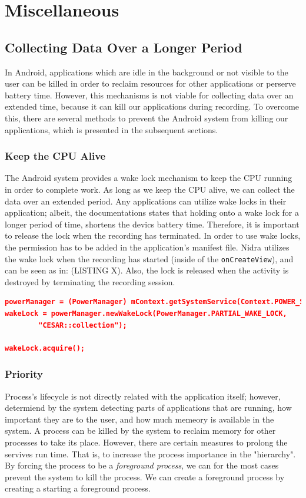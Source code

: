 \section{Miscellaneous}

\subsection{Collecting Data Over a Longer Period}
In Android, applications which are idle in the background or not visible to the user can be killed in order to reclaim resources for other applications or perserve battery time. However, this mechanisms is not viable for collecting data over an extended time, because it can kill our applications during recording. To overcome this, there are several methods to prevent the Android system from killing our applications, which is presented in the subsequent sections.

\subsubsection{Keep the CPU Alive}
The Android system provides a wake lock mechanism to keep the CPU running in order to complete work. As long as we keep the CPU alive, we can collect the data over an extended period. Any applications can utilize wake locks in their application; albeit, the documentations states that holding onto a wake lock for a longer period of time, shortens the devics battery time. Therefore, it is important to release the lock when the recording has terminated. In order to use wake locks, the permission has to be added in the application's manifest file. Nidra utilizes the wake lock when the recording has started (inside of the \verb|onCreateView|), and can be seen as in: (LISTING X). Also, the lock is released when the activity is destroyed by terminating the recording session.

\begin{lstlisting}[language=json, caption={My Caption}, captionpos=b]
powerManager = (PowerManager) mContext.getSystemService(Context.POWER_SERVICE);
wakeLock = powerManager.newWakeLock(PowerManager.PARTIAL_WAKE_LOCK,
        "CESAR::collection");

wakeLock.acquire();
\end{lstlisting}


\subsubsection{Priority}
Process's lifecycle is not directly related with the application itself; however, determiend by the system detecting parts of applications that are running, how important they are to the user, and how much memeory is available in the system. A process can be killed by the system to reclaim memory for other processes to take its place. However, there are certain measures to prolong the servives run time. That is, to increase the process importance in the "hierarchy". By forcing the process to be a \textit{foreground process}, we can for the most cases prevent the system to kill the process. We can create a foreground process by creating a starting a foreground process. 

